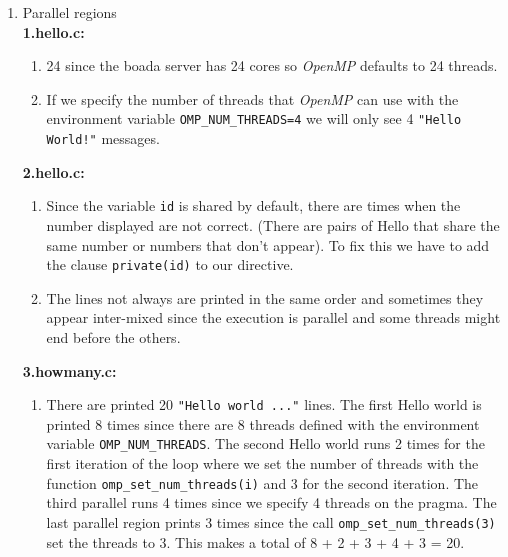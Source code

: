 
\begin{enumerate}[label=\Alph*)]
    \item Parallel regions \\
    \textbf{1.hello.c:}
    \begin{enumerate}[label=\arabic*.]
        \item 24 since the boada server has 24 cores so \emph{OpenMP} defaults to 24 threads.
        \item If we specify the number of threads that \emph{OpenMP} can use with the environment variable \texttt{OMP\_NUM\_THREADS=4} we will only
        see 4 \texttt{"Hello World!"} messages.
    \end{enumerate}
    \textbf{2.hello.c:}
    \begin{enumerate}[label=\arabic*.]
        \item Since the variable \texttt{id} is shared by default, there are times when the number displayed are not correct.
        (There are pairs of Hello that share the same number or numbers that don't appear). To fix this we have to add
        the clause \texttt{private(id)} to our directive.
        \item The lines not always are printed in the same order and sometimes they appear inter-mixed since the execution is parallel and some threads might end before the others.
    \end{enumerate}
    \textbf{3.howmany.c:}
    \begin{enumerate}[label=\arabic*.]
        \item There are printed 20 \texttt{"Hello world ..."} lines.
        The first Hello world is printed 8 times since there are 8 threads defined with the environment
        variable \texttt{OMP\_NUM\_THREADS}. The second Hello world runs 2 times for the first iteration of
        the loop where we set the number of threads with the function \texttt{omp\_set\_num\_threads(i)} and
        3 for the second iteration. The third parallel runs 4 times since we specify 4 threads on the
        pragma. The last parallel region prints 3 times since the call \texttt{omp\_set\_num\_threads(3)} 
        set the threads to 3. This makes a total of  8 + 2 + 3 + 4 + 3 = 20.

\end{enumerate}
\end{enumerate}
